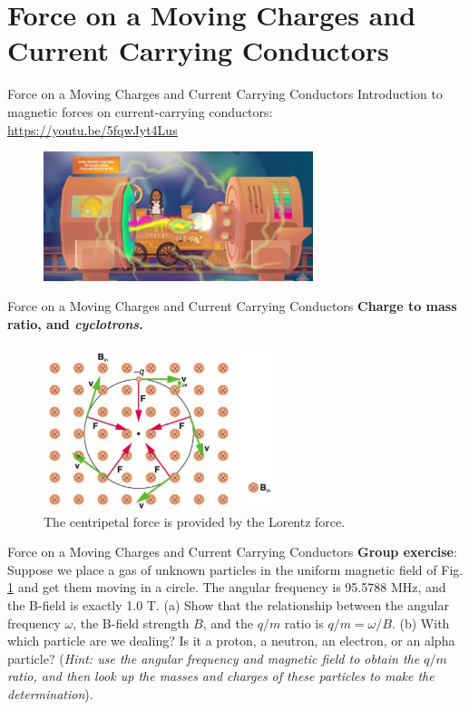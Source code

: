 \documentclass{beamer}
\begin{document}
\section{Force on a Moving Charges and Current Carrying Conductors}

\begin{frame}{Force on a Moving Charges and Current Carrying Conductors}
Introduction to magnetic forces on current-carrying conductors: \\ \vspace{0.5cm}
\url{https://youtu.be/5fqwJyt4Lus} \\
\begin{figure}
\centering
\includegraphics[width=0.7\textwidth]{figures/pbs.png}
\end{figure}
\end{frame}

\begin{frame}{Force on a Moving Charges and Current Carrying Conductors}
\textbf{Charge to mass ratio, and \textit{cyclotrons}.}
\begin{figure}
\centering
\includegraphics[width=0.6\textwidth]{figures/qmcircle.png}
\caption{\label{fig:qmcircle} The centripetal force is provided by the Lorentz force.}
\end{figure}
\end{frame}

\begin{frame}{Force on a Moving Charges and Current Carrying Conductors}
\textbf{Group exercise}: Suppose we place a gas of unknown particles in the uniform magnetic field of Fig. \ref{fig:qmcircle} and get them moving in a circle.  The angular frequency is 95.5788 MHz, and the B-field is exactly 1.0 T.  (a) Show that the relationship between the angular frequency $\omega$, the B-field strength $B$, and the $q/m$ ratio is $q/m = \omega/B$. (b) With which particle are we dealing?  Is it a proton, a neutron, an electron, or an alpha particle? (\textit{Hint: use the angular frequency and magnetic field to obtain the $q/m$ ratio, and then look up the masses and charges of these particles to make the determination}).
\end{frame}
\end{document}
